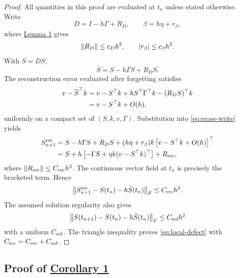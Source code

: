 \begin{proof}
All quantities in this proof are evaluated at $t_n$ unless stated otherwise.
Write
\begin{equation}
 D=I-h\Gamma+R_D,\qquad
 \beta=h\eta+r_\beta,
 \label{eq:local-remainders}
\end{equation}
where \hyperref[lem:expansions]{Lemma 1} gives
\begin{equation}
 \left\lVert R_D\right\rVert\le c_Dh^2,\qquad
 |r_\beta|\le c_\beta h^2.
 \label{eq:local-remainder-bounds}
\end{equation}
With $\overline S=DS$,
\begin{equation}
 \overline S=S-h\Gamma S+R_DS.
 \label{eq:sbar-expansion}
\end{equation}
The reconstruction error evaluated after forgetting satisfies
\begin{align}
 v-\overline S^\top k
 &=
 v-S^\top k+hS^\top\Gamma^\top k-(R_DS)^\top k \notag\\
 &=v-S^\top k+O(h),
 \label{eq:forgotten-error-expansion}
\end{align}
uniformly on a compact set of $(S,k,v,\Gamma)$. Substitution into
\eqref{eq:erase-write} yields
\begin{align}
 S^{\rm rec}_{n+1}
 &=
 S-h\Gamma S+R_DS
 +(h\eta+r_\beta)k
 \left[v-S^\top k+O(h)\right]^\top \notag\\
 &=
 S+h\left[-\Gamma S+\eta k(v-S^\top k)^\top\right]
 +R_{\rm rec},
 \label{eq:recurrence-local-expansion}
\end{align}
where $\left\lVert R_{\rm rec}\right\rVert\le C_{\rm rec}h^2$. The continuous vector field at
$t_n$ is precisely the bracketed term. Hence
\begin{equation}
 \left\lVert 
 S^{\rm rec}_{n+1}-S(t_n)-h\dot S(t_n)\right\rVert_F
 \le C_{\rm rec}h^2.
 \label{eq:recurrence-defect-proof}
\end{equation}
The assumed solution regularity also gives
\begin{equation}
 \left\lVert S(t_{n+1})-S(t_n)-h\dot S(t_n)\right\rVert_F
 \le C_{\rm sol}h^2
 \label{eq:solution-taylor-remainder}
\end{equation}
with a uniform $C_{\rm sol}$. The triangle inequality proves
\eqref{eq:local-defect} with
$C_{\rm loc}=C_{\rm rec}+C_{\rm sol}$.
\end{proof}

\subsection{Proof of \hyperref[cor:global-first-order]{Corollary 1}}
\label{app:global-convergence}

